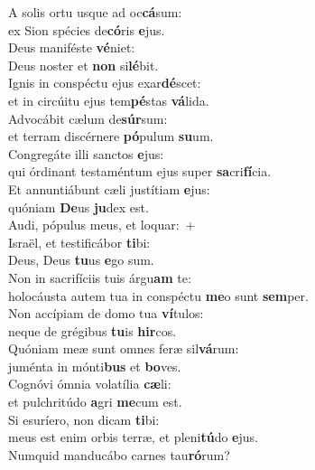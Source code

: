 \evenverse A solis ortu usque ad oc\textbf{cá}sum:~\*\\
\evenverse ex Sion spécies de\textbf{có}ris \textbf{e}jus.\\
\oddverse Deus maniféste \textbf{vé}niet:~\*\\
\oddverse Deus noster et \textbf{non} si\textbf{lé}bit.\\
\evenverse Ignis in conspéctu ejus exar\textbf{dé}scet:~\*\\
\evenverse et in circúitu ejus tem\textbf{pé}stas \textbf{vá}lida.\\
\oddverse Advocábit cælum de\textbf{súr}sum:~\*\\
\oddverse et terram discérnere \textbf{pó}pulum \textbf{su}um.\\
\evenverse Congregáte illi sanctos \textbf{e}jus:~\*\\
\evenverse qui órdinant testaméntum ejus super \textbf{sa}cri\textbf{fí}cia.\\
\oddverse Et annuntiábunt cæli justítiam \textbf{e}jus:~\*\\
\oddverse quóniam \textbf{De}us \textbf{ju}dex est.\\
\evenverse Audi, pópulus meus, et loquar:~+\\
\evenverse  Israël, et testificábor \textbf{ti}bi:~\*\\
\evenverse Deus, Deus \textbf{tu}us \textbf{e}go sum.\\
\oddverse Non in sacrifíciis tuis árgu\textbf{am} te:~\*\\
\oddverse holocáusta autem tua in conspéctu \textbf{me}o sunt \textbf{sem}per.\\
\evenverse Non accípiam de domo tua \textbf{ví}tulos:~\*\\
\evenverse neque de grégibus \textbf{tu}is \textbf{hir}cos.\\
\oddverse Quóniam meæ sunt omnes feræ sil\textbf{vá}rum:~\*\\
\oddverse juménta in mónti\textbf{bus} et \textbf{bo}ves.\\
\evenverse Cognóvi ómnia volatília \textbf{cæ}li:~\*\\
\evenverse et pulchritúdo \textbf{a}gri \textbf{me}cum est.\\
\oddverse Si esuríero, non dicam \textbf{ti}bi:~\*\\
\oddverse meus est enim orbis terræ, et pleni\textbf{tú}do \textbf{e}jus.\\
\evenverse Numquid manducábo carnes tau\textbf{ró}rum?~\*\\
